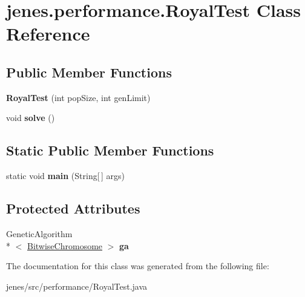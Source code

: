 \hypertarget{classjenes_1_1performance_1_1_royal_test}{\section{jenes.\-performance.\-Royal\-Test Class Reference}
\label{classjenes_1_1performance_1_1_royal_test}
}
\subsection*{Public Member Functions}
\begin{DoxyCompactItemize}
\item 
\hypertarget{classjenes_1_1performance_1_1_royal_test_a07b3000deb54543974d475d6acf38243}{{\bfseries Royal\-Test} (int pop\-Size, int gen\-Limit)}\label{classjenes_1_1performance_1_1_royal_test_a07b3000deb54543974d475d6acf38243}

\item 
\hypertarget{classjenes_1_1performance_1_1_royal_test_a4338b121c1d581f022691a2db6d53e55}{void {\bfseries solve} ()}\label{classjenes_1_1performance_1_1_royal_test_a4338b121c1d581f022691a2db6d53e55}

\end{DoxyCompactItemize}
\subsection*{Static Public Member Functions}
\begin{DoxyCompactItemize}
\item 
\hypertarget{classjenes_1_1performance_1_1_royal_test_a9af2c54a5edd971c03fec8e3b5f0f8c3}{static void {\bfseries main} (String\mbox{[}$\,$\mbox{]} args)}\label{classjenes_1_1performance_1_1_royal_test_a9af2c54a5edd971c03fec8e3b5f0f8c3}

\end{DoxyCompactItemize}
\subsection*{Protected Attributes}
\begin{DoxyCompactItemize}
\item 
\hypertarget{classjenes_1_1performance_1_1_royal_test_a1b996f1c7dd63921753d3e5d70261eb5}{Genetic\-Algorithm\\*
$<$ \hyperlink{classjenes_1_1chromosome_1_1_bitwise_chromosome}{Bitwise\-Chromosome} $>$ {\bfseries ga}}\label{classjenes_1_1performance_1_1_royal_test_a1b996f1c7dd63921753d3e5d70261eb5}

\end{DoxyCompactItemize}


The documentation for this class was generated from the following file\-:\begin{DoxyCompactItemize}
\item 
jenes/src/performance/Royal\-Test.\-java\end{DoxyCompactItemize}
